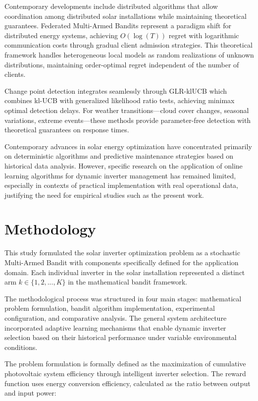 \documentclass[conference]{IEEEtran}
\begin{document}
Contemporary developments include distributed algorithms that allow coordination among distributed solar installations while maintaining theoretical guarantees. Federated Multi-Armed Bandits represent a paradigm shift for distributed energy systems, achieving $O(\log(T))$ regret with logarithmic communication costs through gradual client admission strategies. This theoretical framework handles heterogeneous local models as random realizations of unknown distributions, maintaining order-optimal regret independent of the number of clients.

Change point detection integrates seamlessly through GLR-klUCB which combines kl-UCB with generalized likelihood ratio tests, achieving minimax optimal detection delays. For weather transitions—cloud cover changes, seasonal variations, extreme events—these methods provide parameter-free detection with theoretical guarantees on response times.

Contemporary advances in solar energy optimization have concentrated primarily on deterministic algorithms and predictive maintenance strategies based on historical data analysis. However, specific research on the application of online learning algorithms for dynamic inverter management has remained limited, especially in contexts of practical implementation with real operational data, justifying the need for empirical studies such as the present work.

\section{Methodology}

This study formulated the solar inverter optimization problem as a stochastic Multi-Armed Bandit with components specifically defined for the application domain. Each individual inverter in the solar installation represented a distinct arm $k \in \{1, 2, ..., K\}$ in the mathematical bandit framework.

The methodological process was structured in four main stages: mathematical problem formulation, bandit algorithm implementation, experimental configuration, and comparative analysis. The general system architecture incorporated adaptive learning mechanisms that enable dynamic inverter selection based on their historical performance under variable environmental conditions.

The problem formulation is formally defined as the maximization of cumulative photovoltaic system efficiency through intelligent inverter selection. The reward function uses energy conversion efficiency, calculated as the ratio between output and input power:
\end{document}
